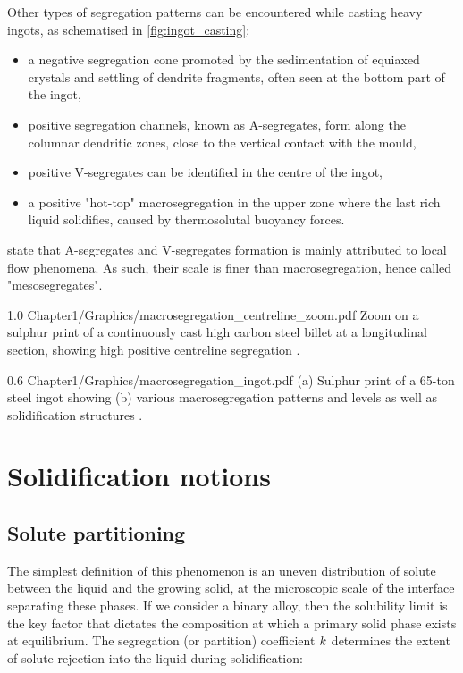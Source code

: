 Other types of segregation patterns can be encountered while casting heavy ingots, as schematised in \cref{fig:ingot_casting}: 
\begin{itemize}
\itemsep0em 
\item a negative segregation cone promoted by the sedimentation of 
	  equiaxed crystals and settling of dendrite fragments, often seen at the bottom part of the ingot,
\item positive segregation channels, known as A-segregates, form along the columnar dendritic zones, close to the vertical contact with the mould,
\item positive V-segregates can be identified in the centre of the ingot,
\item a positive "hot-top" macrosegregation in the upper zone where the last rich liquid solidifies, caused by thermosolutal buoyancy forces. 
\end{itemize}
\citet{combeau_prediction_2009} state that A-segregates and V-segregates formation is mainly attributed to local flow phenomena.
As such, their scale is finer than macrosegregation, hence called "mesosegregates".

\begin{figureth}
{1.0}
{Chapter1/Graphics/macrosegregation_centreline_zoom.pdf}
{Zoom on a sulphur print of a continuously cast high carbon steel billet at a longitudinal section, showing high positive centreline segregation \citep{choudhary_morphology_2007}.}
\label{fig:macroseg_centreline}
\end{figureth}

\begin{figureth}
{0.6}
{Chapter1/Graphics/macrosegregation_ingot.pdf}
{ (a) Sulphur print of a 65-ton steel ingot showing (b) various macrosegregation patterns and levels as well as solidification structures \citep{lesoult_macrosegregation_2005}.}
\label{macrosegregation_ingot}
\end{figureth}


\section{Solidification notions}
%
\subsection{Solute partitioning}
The simplest definition of this phenomenon is an uneven distribution of solute between the liquid and the growing solid, at the microscopic scale
of the interface separating these phases. If we consider a binary alloy, then the solubility limit is 
the key factor that dictates the composition at which a primary solid phase exists at equilibrium. 
The segregation (or partition) coefficient $k$ determines the extent of solute rejection into the liquid during solidification:

